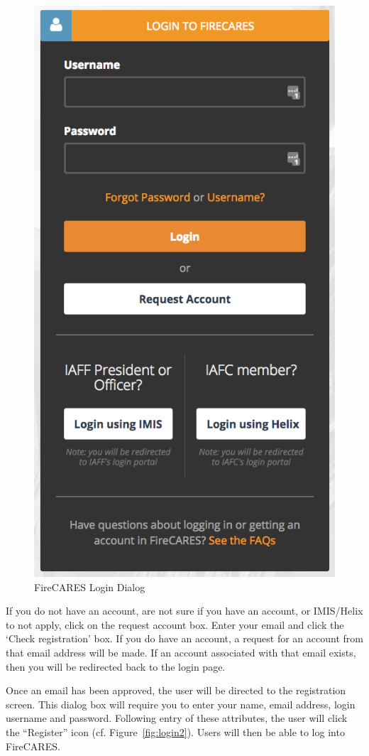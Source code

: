 \documentclass[12pt,oneside]{book}
\begin{document}
\begin{figure}[ht!]
\centering
\includegraphics[width=.5\columnwidth]{Figures/login}
\caption{FireCARES Login Dialog}
\label{fig:login}
\end{figure}

If you do not have an account, are not sure if you have an account, or IMIS/Helix to not apply, click on the request account box. Enter your email and click the `Check registration' box. If you do have an account, a request for an account from that email address will be made. If an account associated with that email exists, then you will be redirected back to the login page. 

\FloatBarrier

Once an email has been approved, the user will be directed to the registration screen. This dialog box will require you to enter your name, email address, login username and password.  Following entry of these attributes, the user will click the ``Register'' icon (cf. Figure~\ref{fig:login2}). Users will then be able to log into FireCARES.
\end{document}
